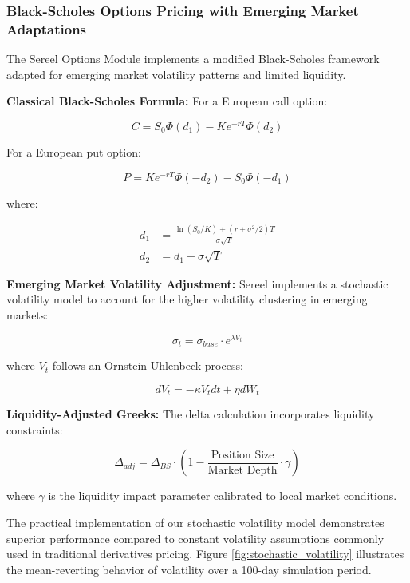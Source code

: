 \documentclass[12pt]{article}
\begin{document}
\subsubsection{Black-Scholes Options Pricing with Emerging Market Adaptations}

The Sereel Options Module implements a modified Black-Scholes framework adapted for emerging market volatility patterns and limited liquidity.

\textbf{Classical Black-Scholes Formula:}
For a European call option:

\begin{equation}
C = S_0 \Phi(d_1) - K e^{-rT} \Phi(d_2)
\end{equation}

For a European put option:

\begin{equation}
P = K e^{-rT} \Phi(-d_2) - S_0 \Phi(-d_1)
\end{equation}

where:

\begin{align}
d_1 &= \frac{\ln(S_0/K) + (r + \sigma^2/2)T}{\sigma\sqrt{T}} \\
d_2 &= d_1 - \sigma\sqrt{T}
\end{align}

\textbf{Emerging Market Volatility Adjustment:}
Sereel implements a stochastic volatility model to account for the higher volatility clustering in emerging markets:

\begin{equation}
\sigma_t = \sigma_{base} \cdot e^{\lambda V_t}
\end{equation}

where $V_t$ follows an Ornstein-Uhlenbeck process:

\begin{equation}
dV_t = -\kappa V_t dt + \eta dW_t
\end{equation}

\textbf{Liquidity-Adjusted Greeks:}
The delta calculation incorporates liquidity constraints:

\begin{equation}
\Delta_{adj} = \Delta_{BS} \cdot \left(1 - \frac{\text{Position Size}}{\text{Market Depth}} \cdot \gamma\right)
\end{equation}

where $\gamma$ is the liquidity impact parameter calibrated to local market conditions.

The practical implementation of our stochastic volatility model demonstrates superior performance compared to constant volatility assumptions commonly used in traditional derivatives pricing. Figure \ref{fig:stochastic_volatility} illustrates the mean-reverting behavior of volatility over a 100-day simulation period.
\end{document}
